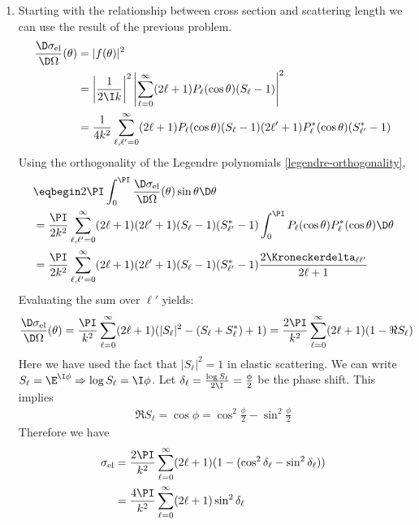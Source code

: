\documentclass[fleqn, 12pt]{article}
\begin{document}
\begin{enumerate}
\item Starting with the relationship between cross section and scattering
  length we can use the result of the previous problem.
  \begin{align*}
    \frac{\D \sigma_{\text{el}}}{\D \Omega} (\theta)
    &= |f(\theta)|^2 \\
    &= \left|\frac{1}{2 \I k}\right|^2
      \left|\sum_{\ell = 0}^\infty (2 \ell + 1)
      P_\ell (\cos \theta) (S_\ell - 1)\right|^2 \\
    &= \frac{1}{4 k^2} \sum_{\ell, \ell' = 0}^\infty
      (2 \ell + 1) P_\ell (\cos \theta) (S_\ell - 1)
      (2 \ell' + 1) P_\ell^* (\cos \theta) (S_{\ell'}^* - 1)
  \end{align*}
  Using the orthogonality of the Legendre polynomials
  \eqref{legendre-orthogonality},
  \begin{align*}
    &\eqbegin 2 \PI \int_0^\PI \frac{\D \sigma_{\text{el}}}{\D \Omega} (\theta)
      \sin \theta \D \theta \\
    &= \frac{\PI}{2 k^2}
      \sum_{\ell, \ell' = 0}^\infty
      (2 \ell + 1) (2 \ell' + 1)
      (S_\ell - 1) (S_{\ell'}^* - 1)
      \int_0^\PI P_\ell(\cos \theta) P_\ell^*(\cos \theta) \D \theta \\
    &= \frac{\PI}{2 k^2}
      \sum_{\ell, \ell' = 0}^\infty
      (2 \ell + 1) (2 \ell' + 1) (S_\ell - 1) (S_{\ell'}^* - 1)
      \frac{2 \Kroneckerdelta_{\ell \ell'}}{2 \ell + 1}
  \end{align*}
  Evaluating the sum over $\ell'$ yields:
  \begin{align*}
    \frac{\D \sigma_{\text{el}}}{\D \Omega}(\theta)
    &= \frac{\PI}{k^2} \sum_{\ell = 0}^\infty (2 \ell + 1) (|S_\ell|^2 - (S_\ell + S_\ell^*) + 1)
    = \frac{2 \PI}{k^2} \sum_{\ell = 0}^\infty (2 \ell + 1) (1 - \Re S_{\ell})
  \end{align*}
  Here we have used the fact that $|S_\ell|^2 = 1$ in elastic scattering.  We
  can write $S_\ell = \E^{\I \phi} \Rightarrow \log S_{\ell} = \I \phi$.  Let
  $\delta_{\ell} = \frac{\log S_{\ell}}{2 \I} = \frac{\phi}{2}$ be the phase
  shift. This implies
  \begin{align*}
    \Re S_{\ell} = \cos \phi = \cos^2 \frac{\phi}{2} - \sin^2 \frac{\phi}{2}
  \end{align*}
  Therefore we have
  \begin{align*}
    \sigma_{\text{el}}
    &= \frac{2 \PI}{k^2} \sum_{\ell = 0}^\infty (2 \ell + 1)
      (1 - (\cos^2 \delta_\ell - \sin^2 \delta_\ell)) \\
    &= \frac{4 \PI}{k^2} \sum_{\ell = 0}^\infty (2 \ell + 1) \sin^2 \delta_\ell
\end{align*}


\end{enumerate}
\end{document}
